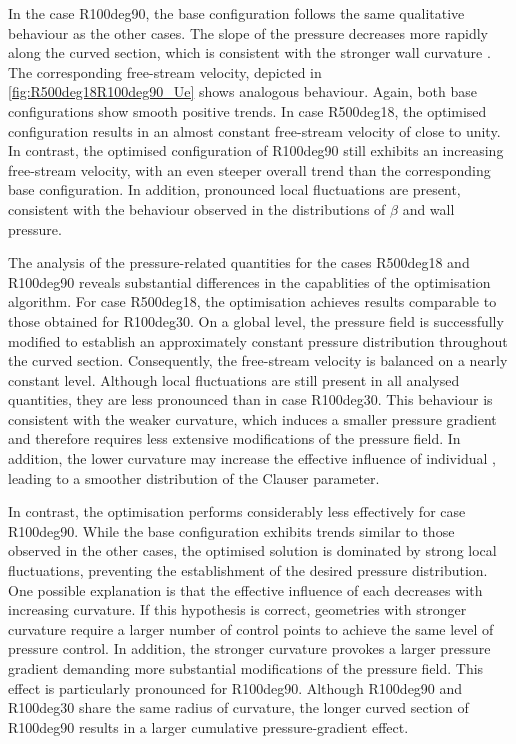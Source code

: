In the case R100deg90,  the base configuration follows the same qualitative behaviour as the other cases. 
The slope of the pressure  decreases more rapidly along  the curved section, which is consistent with the stronger wall curvature .
The corresponding free-stream velocity, depicted in \autoref{fig:R500deg18R100deg90_Ue} shows analogous behaviour.
Again, both base configurations  show smooth positive trends.
In case R500deg18, the optimised configuration results in an almost constant free-stream velocity of close to unity.
In contrast, the optimised configuration of R100deg90 still exhibits an increasing free-stream velocity, with an even steeper overall trend than the corresponding base configuration. In addition, pronounced local fluctuations are present, consistent with the behaviour observed in the distributions of $\beta$ and wall pressure.




The analysis of the pressure-related quantities for the cases R500deg18 and R100deg90 reveals substantial differences in the capablities of the optimisation algorithm. 
For case R500deg18, the optimisation achieves results comparable to those obtained for R100deg30.
On a global level, the pressure field is successfully modified to establish an approximately constant pressure distribution throughout the curved section. 
Consequently,  the free-stream velocity is balanced on a nearly constant level.
 Although local fluctuations are still present in all analysed quantities, they are less pronounced than in case R100deg30. This behaviour is consistent with the weaker curvature, which induces a smaller pressure gradient and therefore requires less extensive modifications of the pressure field. In addition, the lower curvature may increase the effective influence of individual , leading to a smoother distribution of the Clauser parameter.

In contrast, the optimisation performs considerably less effectively for case R100deg90. While the base configuration exhibits trends similar to those observed in the other cases, the optimised solution is dominated by strong local fluctuations, preventing the establishment of the desired pressure distribution. One possible explanation is that the effective influence of each 
 decreases with increasing curvature. If this hypothesis is correct, geometries with stronger curvature require a larger number of control points to achieve the same level of pressure control. 
In addition, the stronger curvature provokes a larger pressure gradient demanding more substantial modifications of the pressure field. This effect is particularly pronounced for R100deg90. Although R100deg90 and R100deg30 share the same radius of curvature, the longer curved section of R100deg90 results in a larger cumulative pressure-gradient effect.



